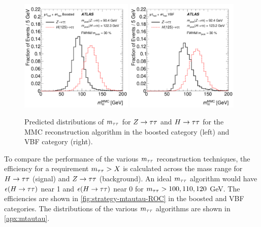 \begin{figure}[tp]
  \centering
  \includegraphics[width=0.48\textwidth]{figures/HIGG-2013-32/fig_01b}
  \includegraphics[width=0.48\textwidth]{figures/HIGG-2013-32/fig_01a}
  \caption{Predicted distributions of $m_{\tau\tau}$ for $Z\rightarrow\tau\tau$ and $H\rightarrow\tau\tau$ for the MMC reconstruction algorithm in the boosted category (left) and VBF category (right).}
  \label{fig:strategy-mtautau-raw}
\end{figure}

To compare the performance of the various $m_{\tau\tau}$ reconstruction techniques, the efficiency for a requirement $m_{\tau\tau} > X$ is calculated across the mass range for $H\rightarrow\tau\tau$ (signal) and $Z\rightarrow\tau\tau$ (background). An ideal $m_{\tau\tau}$ algorithm would have $\epsilon(H\rightarrow\tau\tau)$ near 1 and $\epsilon(H\rightarrow\tau\tau)$ near 0 for $m_{\tau\tau} > 100, 110, 120$ GeV. The efficiencies are shown in \cref{fig:strategy-mtautau-ROC} in the boosted and VBF categories. The distributions of the various $m_{\tau\tau}$ algorithms are shown in \cref{apx:mtautau}.

